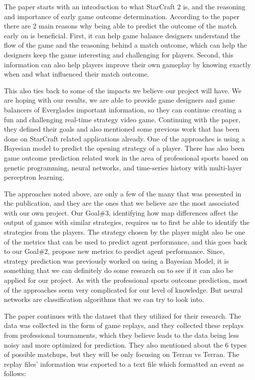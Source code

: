 \documentclass[a4paper,12pt]{report}
\begin{document}
The paper starts with an introduction to what StarCraft 2 is, and the reasoning and importance of early game outcome determination. According to the paper there are 2 main reasons why being able to predict the outcome of the match early on is beneficial. First, it can help game balance designers understand the flow of the game and the reasoning behind a match outcome, which can help the designers keep the game interesting and challenging for players. Second, this information can also help players improve their own gameplay by knowing exactly when and what influenced their match outcome.

This also ties back to some of the impacts we believe our project will have. We are hoping with our results, we are able to provide game designers and game balancers of Everglades important information, so they can continue creating a fun and challenging real-time strategy video game.
Continuing with the paper, they defined their goals and also mentioned some previous work that has been done on StarCraft related applications already. One of the approaches is using a Bayesian model to predict the opening strategy of a player. There has also been game outcome prediction related work in the area of professional sports based on genetic programming, neural networks, and time-series history with multi-layer perceptron learning.

The approaches noted above, are only a few of the many that was presented in the publication, and they are the ones that we believe are the most associated with our own project. Our Goal\#3, identifying how map differences affect the output of games with similar strategies, requires us to first be able to identify the strategies from the players. The strategy chosen by the player might also be one of the metrics that can be used to predict agent performance, and this goes back to our Goal\#2, propose new metrics to predict agent performance. Since, strategy prediction was previously worked on using a Bayesian Model, it is something that we can definitely do some research on to see if it can also be applied for our project. As with the professional sports outcome prediction, most of the approaches seem very complicated for our level of knowledge. But neural networks are classification algorithms that we can try to look into.

The paper continues with the dataset that they utilized for their research. The data was collected in the form of game replays, and they collected these replays from professional tournaments, which they believe leads to the data being less noisy and more optimized for prediction. They also mentioned about the 6 types of possible matchups, but they will be only focusing on Terran vs Terran. The replay files’ information was exported to a text file which formatted an event as follows:
\end{document}
